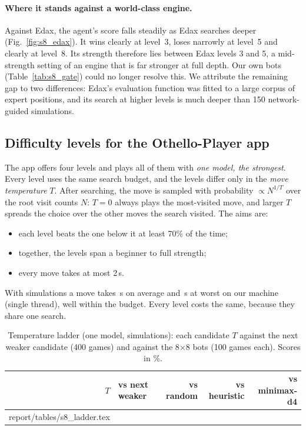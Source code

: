 \documentclass[11pt]{article}
\makeatletter
\newcommand{\bx}[1]{#1$\times$#1}
\newcommand{\tabinput}[1]{\@@input #1 }
\makeatother
\begin{document}
\paragraph{Where it stands against a world-class engine.} Against Edax, the
agent's score falls steadily as Edax searches deeper (Fig.~\ref{fig:s8_edax}).
It wins clearly at level~3, loses narrowly at level~5 and clearly at level~8.
Its strength therefore lies between Edax levels 3 and 5, a mid-strength
setting of an engine that is far stronger at full depth. Our own bots
(Table~\ref{tab:s8_gate}) could no longer resolve this. We attribute the
remaining gap to two differences: Edax's evaluation function was fitted to a
large corpus of expert positions, and its search at higher levels is
much deeper than 150 network-guided simulations.

\subsection{Difficulty levels for the Othello-Player app}
\label{sec:app_levels}

The app offers four levels and plays all of them with \emph{one model, the
strongest}. Every level uses the same search budget, and the levels differ only
in the \emph{move temperature} $T$. After searching, the move is sampled with
probability $\propto N^{1/T}$ over the root visit counts $N$: $T=0$ always plays
the most-visited move, and larger $T$ spreads the choice over the other moves
the search visited. The aims are:
\begin{itemize}[leftmargin=*]
  \item each level beats the one below it at least 70\% of the time;
  \item together, the levels span a beginner to full strength;
  \item every move takes at most 2\,s.
\end{itemize}
With \EightLevelSims{} simulations a move takes \EightMoveMean\,s on average and
\EightMoveMax\,s at worst on our machine (single thread), well within the
budget. Every level costs the same, because they share one search.

\begin{table}[H]
\centering
\caption{Temperature ladder (one model, \EightLevelSims{} simulations): each
candidate $T$ against the next weaker candidate (400 games) and against the
\bx{8} bots (100 games each). Scores in \%.}
\label{tab:s8_ladder}
\small
\begin{tabular}{@{}rlrrr@{}}
\toprule
$T$ & vs next weaker & vs random & vs heuristic & vs minimax-d4 \\
\midrule
\tabinput{report/tables/s8_ladder.tex}
\bottomrule
\end{tabular}
\end{table}
\end{document}
